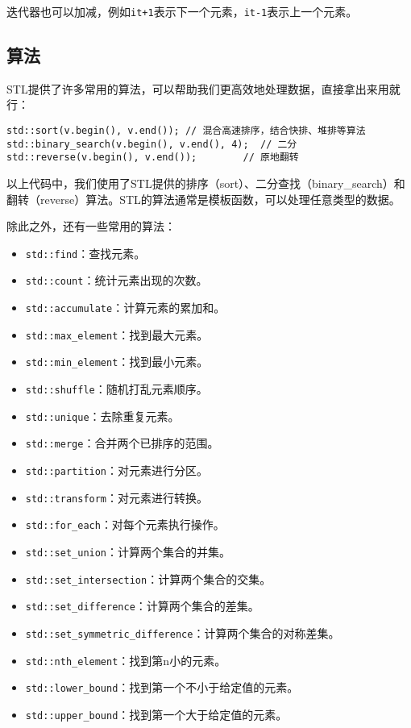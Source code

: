迭代器也可以加减，例如\texttt{it+1}表示下一个元素，\texttt{it-1}表示上一个元素。

\subsection{算法}
STL提供了许多常用的算法，可以帮助我们更高效地处理数据，直接拿出来用就行：
\begin{lstlisting}
std::sort(v.begin(), v.end()); // 混合高速排序，结合快排、堆排等算法
std::binary_search(v.begin(), v.end(), 4);  // 二分
std::reverse(v.begin(), v.end());        // 原地翻转
\end{lstlisting}

以上代码中，我们使用了STL提供的排序（sort）、二分查找（binary\_search）和翻转（reverse）算法。STL的算法通常是模板函数，可以处理任意类型的数据。

除此之外，还有一些常用的算法：
\begin{itemize}
  \item \texttt{std::find}：查找元素。
  \item \texttt{std::count}：统计元素出现的次数。
  \item \texttt{std::accumulate}：计算元素的累加和。
  \item \texttt{std::max\_element}：找到最大元素。
  \item \texttt{std::min\_element}：找到最小元素。
  \item \texttt{std::shuffle}：随机打乱元素顺序。
  \item \texttt{std::unique}：去除重复元素。
  \item \texttt{std::merge}：合并两个已排序的范围。
  \item \texttt{std::partition}：对元素进行分区。
  \item \texttt{std::transform}：对元素进行转换。
  \item \texttt{std::for\_each}：对每个元素执行操作。
  \item \texttt{std::set\_union}：计算两个集合的并集。
  \item \texttt{std::set\_intersection}：计算两个集合的交集。
  \item \texttt{std::set\_difference}：计算两个集合的差集。
  \item \texttt{std::set\_symmetric\_difference}：计算两个集合的对称差集。
  \item \texttt{std::nth\_element}：找到第n小的元素。
  \item \texttt{std::lower\_bound}：找到第一个不小于给定值的元素。
  \item \texttt{std::upper\_bound}：找到第一个大于给定值的元素。
\end{itemize}

